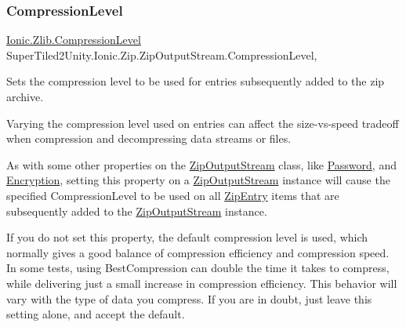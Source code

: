 \subsubsection{\texorpdfstring{Compression\+Level}{CompressionLevel}}
{\footnotesize\ttfamily \mbox{\hyperlink{namespace_super_tiled2_unity_1_1_ionic_1_1_zlib_a20f6771804996c363f454ad9765cd7db}{Ionic.\+Zlib.\+Compression\+Level}} Super\+Tiled2\+Unity.\+Ionic.\+Zip.\+Zip\+Output\+Stream.\+Compression\+Level\hspace{0.3cm}{\ttfamily [get]}, {\ttfamily [set]}}



Sets the compression level to be used for entries subsequently added to the zip archive. 

Varying the compression level used on entries can affect the size-\/vs-\/speed tradeoff when compression and decompressing data streams or files. 

As with some other properties on the {\ttfamily \mbox{\hyperlink{class_super_tiled2_unity_1_1_ionic_1_1_zip_1_1_zip_output_stream}{Zip\+Output\+Stream}}} class, like \mbox{\hyperlink{class_super_tiled2_unity_1_1_ionic_1_1_zip_1_1_zip_output_stream_a574733e2d7d17252b7d89f966d588eb9}{Password}}, and \mbox{\hyperlink{class_super_tiled2_unity_1_1_ionic_1_1_zip_1_1_zip_output_stream_af1e123174110807666b7c4df62959112}{Encryption}}, setting this property on a {\ttfamily \mbox{\hyperlink{class_super_tiled2_unity_1_1_ionic_1_1_zip_1_1_zip_output_stream}{Zip\+Output\+Stream}}} instance will cause the specified {\ttfamily Compression\+Level} to be used on all \mbox{\hyperlink{class_super_tiled2_unity_1_1_ionic_1_1_zip_1_1_zip_entry}{Zip\+Entry}} items that are subsequently added to the {\ttfamily \mbox{\hyperlink{class_super_tiled2_unity_1_1_ionic_1_1_zip_1_1_zip_output_stream}{Zip\+Output\+Stream}}} instance. 

If you do not set this property, the default compression level is used, which normally gives a good balance of compression efficiency and compression speed. In some tests, using {\ttfamily Best\+Compression} can double the time it takes to compress, while delivering just a small increase in compression efficiency. This behavior will vary with the type of data you compress. If you are in doubt, just leave this setting alone, and accept the default. \mbox{\label{class_super_tiled2_unity_1_1_ionic_1_1_zip_1_1_zip_output_stream_a277b3eee8ff85940ed16ba2cc69a19cf}} 
